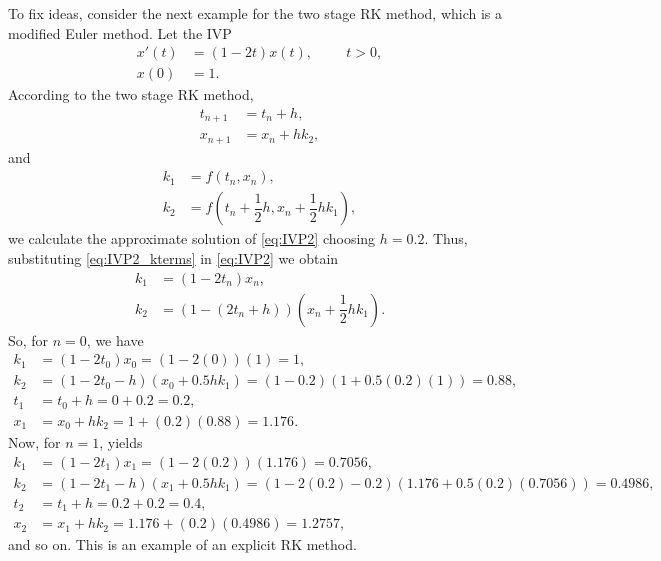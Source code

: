     To fix ideas, consider the next example for the two stage RK method, which 
    is a modified Euler method. Let the IVP
    \begin{equation}\label{eq:IVP2}
        \begin{aligned}
            x'(t) &= (1-2t)x(t), \hspace{1cm} t>0, \\
            x(0)  &= 1.
        \end{aligned}
    \end{equation}
    According to the two stage RK method, 
    \begin{align*}
        t_{n+1} &= t_n + h, \\
        x_{n+1} &= x_n + hk_2, 
    \end{align*}
    and
    \begin{equation}\label{eq:IVP2_kterms}
        \begin{aligned}
            k_1 &= f(t_n, x_n), \\
            k_2 &= f\left(t_n + \dfrac{1}{2}h, x_n + \dfrac{1}{2}hk_1 \right),
        \end{aligned}
    \end{equation}
    we calculate the approximate solution of \ref{eq:IVP2} choosing $h=0.2$.
    Thus, substituting \ref{eq:IVP2_kterms} in \ref{eq:IVP2} we obtain
    \begin{align*}
        k_1 &= (1- 2t_n)x_n,\\
        k_2 &= (1 - (2t_n + h))\left(x_n + \dfrac{1}{2}h k_1\right).
    \end{align*}
    So, for $n = 0$, we have
    \begin{align*}
        k_1 &= (1-2t_0)x_0 = (1 - 2(0))(1) = 1,    \\ 
        k_2 &= (1 - 2t_0 - h)(x_0 + 0.5hk_1) = (1-0.2)(1+0.5(0.2)(1)) = 0.88, \\
        t_1 &= t_0 + h = 0 + 0.2 = 0.2, \\
        x_1 &= x_0 + hk_2 = 1 + (0.2)(0.88) = 1.176.
    \end{align*}
    Now, for $n=1$, yields
    \begin{align*}
        k_1 &= (1-2t_1)x_1 = (1 - 2(0.2))(1.176) = 0.7056,    \\ 
        k_2 &= (1 - 2t_1 - h)(x_1 + 0.5hk_1) =
            (1-2(0.2)-0.2)(1.176+0.5(0.2)(0.7056)) = 0.4986, \\
        t_2 &= t_1 + h = 0.2 + 0.2 = 0.4, \\
        x_2 &= x_1 + hk_2 = 1.176 + (0.2)(0.4986) = 1.2757,
    \end{align*}
    and so on. This is an example of an explicit RK method.
    
